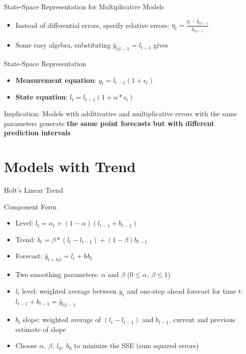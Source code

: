 \documentclass{beamer}
\begin{document}
\begin{frame}{State-Space Representation for Multiplicative Models}
  \begin{itemize}
  \item Instead of differential errors, specify relative errors: $\eta_t = \frac{y_t - \hat{y}_{t|t-1}}{ \hat{y}_{t|t-1}}$
  \item Some easy algebra, substituting $\hat{y}_{t|t-1} = l_{t-1}$ gives   
  \end{itemize}

  \begin{block}{State-Space Representation}
    \begin{itemize}
    \item \textbf{Measurement equation}: $y_t = l_{t-1}(1+\epsilon_t)$
    \item \textbf{State equation}: $l_t = l_{t-1}(1+\alpha*\epsilon_t)$
    \end{itemize}
  \end{block}

Implication: Models with additivative and multiplicative errors with the same parameters generate \textbf{the same point forecasts but with different prediction intervals}
  
\end{frame}



\section{Models with Trend}

\begin{frame}{Holt's Linear Trend}

  \begin{block}{Component Form}
    \begin{itemize}
    \item Level: $l_t = \alpha_t + (1-\alpha)(l_{t-1}+ b_{t-1})$
    \item Trend: $b_t = \beta*(l_t - l_{t-1}) + (1-\beta)b_{t-1}$
    \item Forecast: $\hat{y}_{t+h|t}=  l_t + hb_t$
    \end{itemize}
  \end{block}

  \begin{itemize}
  \item Two smoothing parameters: $\alpha$ and $\beta$ ($0 \leq \alpha, \ \beta \leq 1$)
  \item $l_t$ level: weighted average between $y_t$ and one-step ahead forecast for time $t$: $l_{t-1} + b_{t-1} = \hat{y}_{t|t-1}$
  \item $b_t$ slope: weighted average of $(l_t - l_{t-1})$ and $b_{t-1}$, current and previous estimate of slope
  \item Choose $\alpha, \ \beta, \ l_0, \ b_0$ to mininize the SSE (sum squared errors)
  \end{itemize}
\end{frame}
\end{document}
